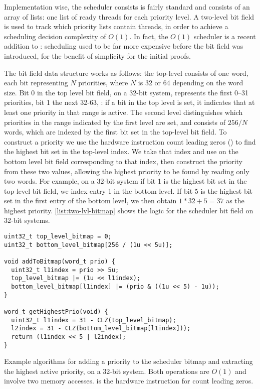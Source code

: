 Implementation wise, the scheduler consists is fairly standard and consists
of an array of lists: one list of ready threads for each
priority level. A two-level bit field is used to track which priority lists contain threads, 
in order to achieve a scheduling decision complexity of $O(1)$. In fact, the \(O(1)\) scheduler is a
recent addition to \selfour: scheduling used to be far more expensive before the bit field was
introduced, for the benefit of simplicity for the initial proofs.

The bit field data structure works as follows: the
top-level consists of one word, each bit representing $N$ priorities, where $N$ is 32 or 64
depending on the word size. Bit 0 in the top level bit field, on a 32-bit system, represents the first 0--31
priorities, bit 1 the next 32-63, \etc: if a bit in the top level is set, it indicates that at least
one priority in that range is active. 
The second level distinguishes which priorities in the
range indicated by the first level are set, and consists of $256/N$ words, which are indexed by the first bit set in the
top-level bit field. To construct a priority we use the hardware instruction count leading zeros
() to find the highest bit set in the top-level index. We take that index and use
 on the bottom level bit field corresponding to that index, then construct the priority
from these two values, allowing the highest priority to be found by reading only two words. For
example, on a 32-bit system 
if bit 1 is the highest bit set in the top-level bit field, we index entry 1 in the
bottom level. If bit 5 is the highest bit set in the first entry of the bottom level, we then obtain
$1 * 32 + 5 = 37$ as the highest priority. 
\cref{list:two-lvl-bitmap} shows the logic for the scheduler bit field on 32-bit systems.

\begin{listing}
    \begin{verbatim}
uint32_t top_level_bitmap = 0;
uint32_t bottom_level_bitmap[256 / (1u << 5u)];

void addToBitmap(word_t prio) {
  uint32_t l1index = prio >> 5u;
  top_level_bitmap |= (1u << l1index);
  bottom_level_bitmap[l1index] |= (prio & ((1u << 5) - 1u));
}

word_t getHighestPrio(void) {
  uint32_t l1index = 31 - CLZ(top_level_bitmap);
  l2index = 31 - CLZ(bottom_level_bitmap[l1index]));
  return (l1index << 5 | l2index);
}
\end{verbatim}
    \caption[Scheduler bitmap algorithm.]{Example algorithms for adding a priority to the scheduler bitmap and extracting the highest
        active priority, on a 32-bit system. Both operations are $O(1)$ and involve two memory
        accesses. 
     is the hardware instruction for count leading zeros.}
    \label{list:two-lvl-bitmap}
\end{listing}


